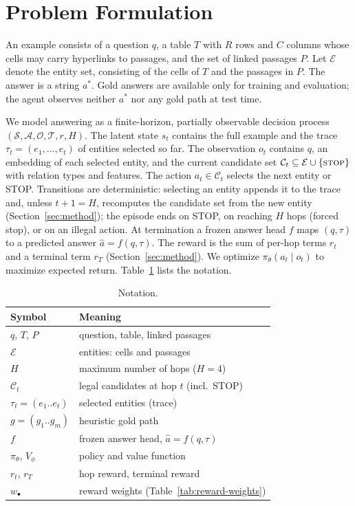 \section{Problem Formulation}
\label{sec:formulation}

An example consists of a question $q$, a table $T$ with $R$ rows and $C$ columns whose cells may carry hyperlinks to passages, and the set of linked passages $P$.
Let $\mathcal{E}$ denote the entity set, consisting of the cells of $T$ and the passages in $P$.
The answer is a string $a^\ast$.
Gold answers are available only for training and evaluation; the agent observes neither $a^\ast$ nor any gold path at test time.

We model answering as a finite-horizon, partially observable decision process $(\mathcal{S},\mathcal{A},\mathcal{O},\mathcal{T},r,H)$.
The latent state $s_t$ contains the full example and the trace $\tau_t=(e_1,\dots,e_t)$ of entities selected so far.
The observation $o_t$ contains $q$, an embedding of each selected entity, and the current candidate set $\mathcal{C}_t\subseteq\mathcal{E}\cup\{\textsc{stop}\}$ with relation types and features.
The action $a_t\in\mathcal{C}_t$ selects the next entity or STOP.
Transitions are deterministic: selecting an entity appends it to the trace and, unless $t+1=H$, recomputes the candidate set from the new entity (Section~\ref{sec:method}); the episode ends on STOP, on reaching $H$ hops (forced stop), or on an illegal action.
At termination a frozen answer head $f$ maps $(q,\tau)$ to a predicted answer $\hat a=f(q,\tau)$.
The reward is the sum of per-hop terms $r_t$ and a terminal term $r_T$ (Section~\ref{sec:method}).
We optimize $\pi_\theta(a_t\mid o_t)$ to maximize expected return.
Table~\ref{tab:notation} lists the notation.

\begin{table}[t]
\centering\small
\begin{tabular}{@{}ll@{}}
\toprule
Symbol & Meaning \\
\midrule
$q$, $T$, $P$ & question, table, linked passages \\
$\mathcal{E}$ & entities: cells and passages \\
$H$ & maximum number of hops ($H=4$) \\
$\mathcal{C}_t$ & legal candidates at hop $t$ (incl.\ STOP) \\
$\tau_t=(e_1..e_t)$ & selected entities (trace) \\
$g=(g_1..g_m)$ & heuristic gold path \\
$f$ & frozen answer head, $\hat a=f(q,\tau)$ \\
$\pi_\theta$, $V_\phi$ & policy and value function \\
$r_t$, $r_T$ & hop reward, terminal reward \\
$w_\bullet$ & reward weights (Table~\ref{tab:reward-weights}) \\
\bottomrule
\end{tabular}
\caption{Notation.}
\label{tab:notation}
\end{table}
